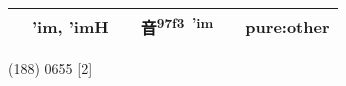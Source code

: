 \documentclass[14pt,a4paper]{scrartcl}
\begin{document}
\begin{longtable}[c]{@{}llllll@{}}
\begin{minipage}[t]{0.14\columnwidth}
\strut\end{minipage} &
\begin{minipage}[t]{0.14\columnwidth}\raggedright\strut
'im, 'imH
\strut\end{minipage} &
\begin{minipage}[t]{0.14\columnwidth}\raggedright\strut
\strut\end{minipage} &
\begin{minipage}[t]{0.14\columnwidth}\raggedright\strut
音\textsuperscript{97f3~'im}
\strut\end{minipage} &
\begin{minipage}[t]{0.14\columnwidth}\raggedright\strut
\strut\end{minipage} &
\begin{minipage}[t]{0.14\columnwidth}\raggedright\strut
pure:other
\strut\end{minipage}\tabularnewline
\bottomrule
\end{longtable}

(188) 0655 {[}2{]}
\end{document}
